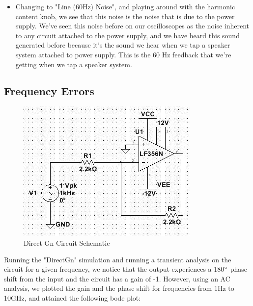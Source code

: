 \documentclass{article}
\begin{document}
\begin{itemize}
        \item Changing to "Line (60Hz) Noise", and playing around with the harmonic content knob, we see that this noise is the noise that is due to the power supply. We've seen this noise before on our oscilloscopes as the noise inherent to any circuit attached to the power supply, and we have heard this sound generated before because it's the sound we hear when we tap a speaker system attached to power supply. This is the 60 Hz feedback that we're getting when we tap a speaker system. 
    \end{itemize} 

\subsection{Frequency Errors}
    \begin{figure}[H]
        \centering
        \includegraphics[scale = 0.35]{14a.jpeg}
        \caption{Direct Gn Circuit Schematic}
        \label{fig:my_label}
    \end{figure}
    Running the "DirectGn" simulation and running a transient analysis on the circuit for a given frequency, we notice that the output experiences a 180$\degree$ phase shift from the input and the circuit has a gain of -1. However, using an AC analysis, we plotted the gain and the phase shift for frequencies from 1Hz to 10GHz, and attained the following bode plot:
\end{document}
